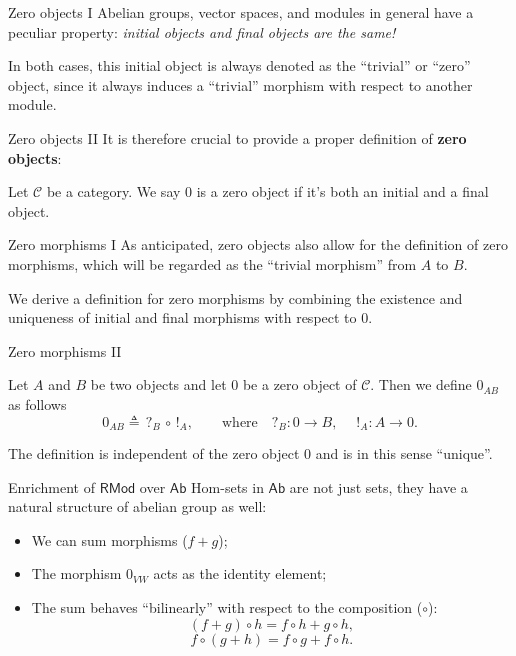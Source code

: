 \documentclass{beamer}
\newcommand{\cat}[1]{\mathsf{#1}}
\begin{document}
\begin{frame}{Zero objects I}
    Abelian groups, vector spaces, and modules in general have a peculiar property: \textit{initial objects and
    final objects are the same!} \medskip
    
    In both cases, this initial object is always
    denoted as the ``trivial'' or ``zero'' object, since it always induces a
    ``trivial'' morphism with respect to another module.
\end{frame}

\begin{frame}{Zero objects II}
    It is therefore crucial to provide a proper definition of \textbf{zero objects}: \medskip
    
    \begin{definition}
        Let $\mathcal{C}$ be a category. We say $0$ is a
        zero object if it's both an initial and
        a final object.
    \end{definition}
\end{frame}

\begin{frame}{Zero morphisms I}
    As anticipated, zero objects also allow for the
    definition of zero morphisms, which will be regarded as the
    ``trivial morphism'' from $A$ to $B$. \medskip

    We derive a definition for zero morphisms
    by combining the existence and uniqueness of initial and final morphisms
    with respect to $0$.
\end{frame}

\begin{frame}{Zero morphisms II}
    \begin{definition}
        Let $A$ and $B$ be two objects and let $0$ be a zero
        object of $\mathcal{C}$. Then we define $0_{AB}$ as
        follows
        \[
            0_{AB} \triangleq \, ?_{B} \, \circ \, !_{A}, \qquad \text{where} \quad ?_B : 0 \to B, \quad\; !_A : A \to 0.
        \]
    \end{definition}

    The definition is independent of the zero object $0$ and is
    in this sense ``unique''.
\end{frame}

\begin{frame}{Enrichment of \texorpdfstring{$\cat{RMod}$}{RMod} over \texorpdfstring{$\cat{Ab}$}{Ab}}
    Hom-sets in $\cat{Ab}$ are not just sets, they have a natural structure
    of abelian group as well:

    \begin{itemize}
        \item We can sum morphisms ($f + g$);
        \item The morphism $0_{VW}$ acts as the identity element;
        \item The sum behaves ``bilinearly'' with respect to the composition ($\circ$):
            \[
                (f + g) \circ h = f \circ h + g \circ h,
            \]
            \[
                f \circ (g + h) = f \circ g + f \circ h.
            \]
    \end{itemize}
\end{frame}
\end{document}
